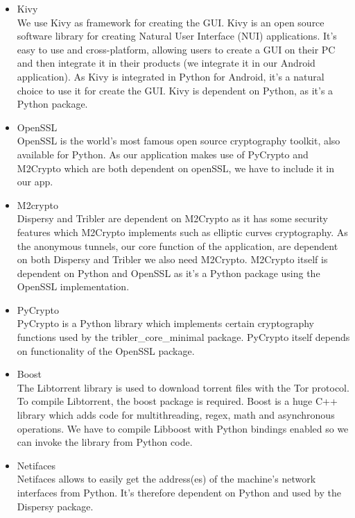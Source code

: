 \documentclass{article}
\begin{document}
	\begin{itemize}
	
		\item Kivy\\
		We use Kivy as framework for creating the GUI. Kivy is an open source software library for creating Natural User Interface (NUI) applications. It's easy to use and cross-platform, allowing users to create a GUI on their PC and then integrate it in their products (we integrate it in our Android application). As Kivy is integrated in Python for Android, it's a natural choice to use it for create the GUI. Kivy is dependent on Python, as it's a Python package. 
	
		\item OpenSSL\\
		OpenSSL is the world's most famous open source cryptography toolkit, also available for Python. As our application makes use of PyCrypto and M2Crypto which are both dependent on openSSL, we have to include it in our app.
	
		\item M2crypto\\
		Dispersy and Tribler are dependent on M2Crypto as it has some security features which M2Crypto implements such as elliptic curves cryptography. As the anonymous tunnels, our core function of the application, are dependent on both Dispersy and Tribler we also need M2Crypto. M2Crypto itself is dependent on Python and OpenSSL as it's a Python package using the OpenSSL implementation.
	
		\item PyCrypto\\
		PyCrypto is a Python library which implements certain cryptography functions used by the tribler\_core\_minimal package. PyCrypto itself depends on functionality of the OpenSSL package.
	
		\item Boost\\
		The Libtorrent library is used to download torrent files with the Tor protocol. To compile Libtorrent, the boost package is required. Boost is a huge C++ library which adds code for multithreading, regex, math and asynchronous operations. We have to compile Libboost with Python bindings enabled so we can invoke the library from Python code.
	
		\item Netifaces\\
		Netifaces allows to easily get the address(es) of the machine's network interfaces from Python. It's therefore dependent on Python and used by the Dispersy package.
	

\end{itemize}
\end{document}
